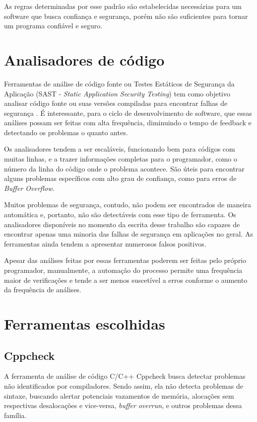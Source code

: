 As regras determinadas por esse padrão são estabelecidas necessárias para um software que busca confiança e segurança, porém não são suficientes para tornar um programa confiável e seguro.

\section{Analisadores de código}

Ferramentas de análise de código fonte ou Testes Estáticos de Segurança da Aplicação (SAST - \textit{Static Application Security Testing}) tem como objetivo analisar código fonte ou suas versões compiladas para encontrar falhas de segurança \cite{owaspscat}. É interessante, para o ciclo de desenvolvimento de software, que essas análises possam ser feitas com alta frequência, diminuindo o tempo de feedback e detectando os problemas o quanto antes.

Os analisadores tendem a ser escaláveis, funcionando bem para códigos com muitas linhas, e a trazer informações completas para o programador, como o número da linha do código onde o problema acontece. São úteis para encontrar alguns problemas específicos com alto grau de confiança, como para erros de \textit{Buffer Overflow}.

Muitos problemas de segurança, contudo, não podem ser encontrados de maneira automática e, portanto, não são detectáveis com esse tipo de ferramenta. Os analisadores disponíveis no momento da escrita desse trabalho são capazes de encontrar apenas uma minoria das falhas de segurança em aplicações no geral. As ferramentas ainda tendem a apresentar numerosos falsos positivos.

Apesar das análises feitas por essas ferramentas poderem ser feitas pelo próprio programador, manualmente, a automação do processo permite uma frequência maior de verificações e tende a ser menos suscetível a erros conforme o aumento da frequência de análises.

\section{Ferramentas escolhidas}

\subsection{Cppcheck}

A ferramenta de análise de código C/C++ Cppcheck \cite{cppcheck} busca detectar problemas não identificados por compiladores. Sendo assim, ela não detecta problemas de sintaxe, buscando alertar potenciais vazamentos de memória, alocações sem respectivas desalocações e vice-versa, \textit{buffer overrun}, e outros problemas dessa família.

